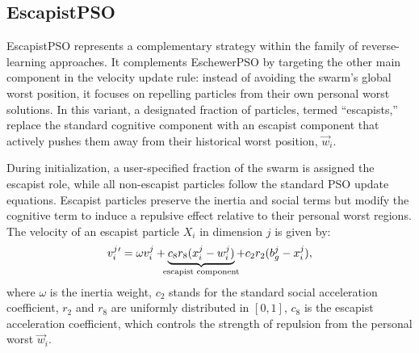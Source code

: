 {%

\enlargethispage{.1\baselineskip}
\subsection{EscapistPSO}

EscapistPSO represents a complementary strategy within the family of reverse-learning approaches. It complements EschewerPSO by targeting the other main component in the velocity update rule: instead of avoiding the swarm’s global worst position, it focuses on repelling particles from their own personal worst solutions. In this variant, a designated fraction of particles, termed ``escapists,'' replace the standard cognitive component with an escapist component that actively pushes them away from their historical worst position, $\vec{w}_i$.

During initialization, a user-specified fraction of the swarm is assigned the escapist role, while all non-escapist particles follow the standard PSO update equations. Escapist particles preserve the inertia and social terms but modify the cognitive term to induce a repulsive effect relative to their personal worst regions.
The velocity of an escapist particle $X_i$ in dimension $j$ is given by:
\begin{equation}\label{eq:velocity_update_escapist}
    v_{i}^{j}{}' = \omega v_{i}^{j} +
\underbrace{c_8 r_8 (x_{i}^{j} - w_{i}^{j})}_{\mathclap{\text{escapist component}}} +
c_2 r_2 (b_{g}^{j} - x_{i}^{j}),
\end{equation}
where
$\omega$ is the inertia weight,
$c_2$ stands for the standard social acceleration coefficient,
$r_2$ and $r_8$ are uniformly distributed in $[0, 1]$,
$c_8$ is the escapist acceleration coefficient, which controls the strength of repulsion from the personal worst $\vec{w}_i$.

\begin{figure}[H]
    \centering
\end{figure}}
